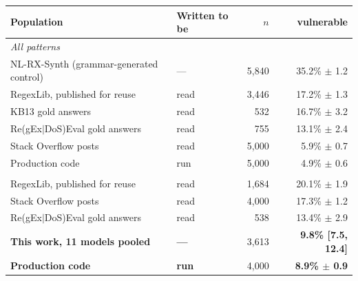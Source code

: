 \begin{tabular}{llrr}
\toprule
Population & Written to be & $n$ & vulnerable \\
\midrule
\multicolumn{4}{l}{\emph{All patterns}} \\
NL-RX-Synth (grammar-generated control) & --- & 5{,}840 & 35.2\% $\pm$ 1.2 \\
RegexLib, published for reuse & read & 3{,}446 & 17.2\% $\pm$ 1.3 \\
KB13 gold answers & read & 532 & 16.7\% $\pm$ 3.2 \\
Re(gEx$|$DoS)Eval gold answers & read & 755 & 13.1\% $\pm$ 2.4 \\
Stack Overflow posts & read & 5{,}000 & 5.9\% $\pm$ 0.7 \\
Production code & run & 5{,}000 & 4.9\% $\pm$ 0.6 \\
\addlinespace
\multicolumn{4}{l}{\emph{Anchored \texttt{\^{}...\$} only, controlling for task mix}} \\
RegexLib, published for reuse & read & 1{,}684 & 20.1\% $\pm$ 1.9 \\
Stack Overflow posts & read & 4{,}000 & 17.3\% $\pm$ 1.2 \\
Re(gEx$|$DoS)Eval gold answers & read & 538 & 13.4\% $\pm$ 2.9 \\
\textbf{This work, 11 models pooled} & \textbf{---} & 3{,}613 & \textbf{9.8\% [7.5, 12.4]} \\
\textbf{Production code} & \textbf{run} & 4{,}000 & \textbf{8.9\% $\pm$ 0.9} \\
\bottomrule
\end{tabular}
